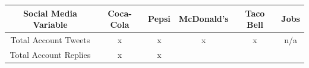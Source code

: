 \documentclass[12pt,oneside]{chicagocapstone}
\begin{document}
\begin{longtable}[]{@{}cccccc@{}}
\toprule
\begin{minipage}[b]{0.22\columnwidth}\centering
Social Media Variable\strut
\end{minipage} & \begin{minipage}[b]{0.10\columnwidth}\centering
Coca-Cola\strut
\end{minipage} & \begin{minipage}[b]{0.11\columnwidth}\centering
Pepsi\strut
\end{minipage} & \begin{minipage}[b]{0.13\columnwidth}\centering
McDonald's\strut
\end{minipage} & \begin{minipage}[b]{0.13\columnwidth}\centering
Taco Bell\strut
\end{minipage} & \begin{minipage}[b]{0.13\columnwidth}\centering
Jobs\strut
\end{minipage}\tabularnewline
\midrule
\endhead
\begin{minipage}[t]{0.22\columnwidth}\centering
Total Account Tweets\strut
\end{minipage} & \begin{minipage}[t]{0.10\columnwidth}\centering
x\strut
\end{minipage} & \begin{minipage}[t]{0.11\columnwidth}\centering
x\strut
\end{minipage} & \begin{minipage}[t]{0.13\columnwidth}\centering
x\strut
\end{minipage} & \begin{minipage}[t]{0.13\columnwidth}\centering
x\strut
\end{minipage} & \begin{minipage}[t]{0.13\columnwidth}\centering
n/a\strut
\end{minipage}\tabularnewline
\begin{minipage}[t]{0.22\columnwidth}\centering
Total Account Replies\strut
\end{minipage} & \begin{minipage}[t]{0.10\columnwidth}\centering
x\strut
\end{minipage} & \begin{minipage}[t]{0.11\columnwidth}\centering
x\strut
\end{minipage} & \begin{minipage}[t]{0.13\columnwidth}\centering

\end{minipage}
\end{longtable}
\end{document}
